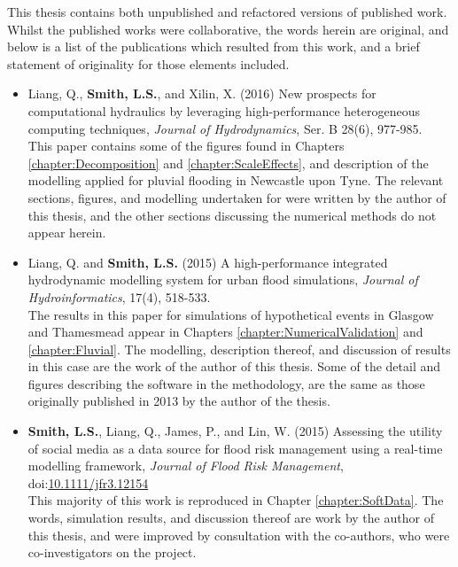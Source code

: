 \begin{publications}
This thesis contains both unpublished and refactored versions of published work. Whilst the published works were collaborative, the words herein are original, and below is a list of the publications which resulted from this work, and a brief statement of originality for those elements included.

\begin{itemize}
	\item\raggedright Liang, Q., \textbf{Smith, L.S.}, and Xilin, X. (2016) New prospects for computational hydraulics by leveraging high-performance heterogeneous computing techniques, \textit{Journal of Hydrodynamics}, Ser. B 28(6), 977-985. \\[1ex]
	This paper contains some of the figures found in Chapters \ref{chapter:Decomposition} and \ref{chapter:ScaleEffects}, and description of the modelling applied for pluvial flooding in Newcastle upon Tyne. The relevant sections, figures, and modelling undertaken for were written by the author of this thesis, and the other sections discussing the numerical methods do not appear herein.
	\\[2ex]
	
	\item\raggedright Liang, Q. and \textbf{Smith, L.S.} (2015) A high-performance integrated hydrodynamic modelling system for urban flood simulations, \textit{Journal of Hydroinformatics}, 17(4), 518-533. \\[1ex]
	The results in this paper for simulations of hypothetical events in Glasgow and Thamesmead appear in Chapters \ref{chapter:NumericalValidation} and \ref{chapter:Fluvial}. The modelling, description thereof, and discussion of results in this case are the work of the author of this thesis. Some of the detail and figures describing the software in the methodology, are the same as those originally published in 2013 by the author of the thesis.
	\\[2ex]
	
	\item\raggedright \textbf{Smith, L.S.}, Liang, Q., James, P., and Lin, W. (2015) Assessing the utility of social media as a data source for flood risk management using a real-time modelling framework, \textit{Journal of Flood Risk Management}, doi:\href{http://dx.doi.org/10.1111/jfr3.12154}{10.1111/jfr3.12154} \\[1ex]
	This majority of this work is reproduced in Chapter \ref{chapter:SoftData}. The words, simulation results, and discussion thereof are work by the author of this thesis, and were improved by consultation with the co-authors, who were co-investigators on the project.
	\\[2ex]
	

\end{itemize}
\end{publications}
